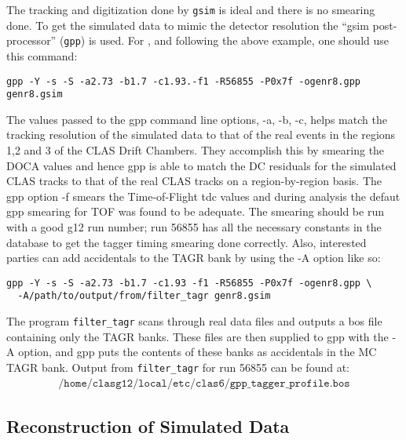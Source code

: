 The tracking and digitization done by \texttt{gsim} is ideal and there is no smearing done. To get the simulated data to mimic the detector resolution the ``gsim post-processor'' (\texttt{gpp}) is used. For , and following the above example, one should use this command:
\begin{verbatim}
gpp -Y -s -S -a2.73 -b1.7 -c1.93.-f1 -R56855 -P0x7f -ogenr8.gpp genr8.gsim
\end{verbatim}
The values passed to the gpp command line options, -a, -b, -c, helps match the tracking resolution of the simulated data to that of the real events in the regions 1,2 and 3 of the CLAS Drift Chambers. They accomplish this by smearing the DOCA values and hence gpp is able to match the DC residuals for the simulated CLAS tracks to that of the real CLAS tracks on a region-by-region basis. The gpp option -f smears the Time-of-Flight tdc values and during analysis the defaut gpp smearing for TOF was found to be adequate. The smearing should be run with a good g12 run number; run 56855 has all the necessary constants in the database to get the tagger timing smearing done correctly. Also, interested parties can add accidentals to the TAGR bank by using the -A option like so:
\begin{verbatim}
gpp -Y -s -S -a2.73 -b1.7 -c1.93 -f1 -R56855 -P0x7f -ogenr8.gpp \
  -A/path/to/output/from/filter_tagr genr8.gsim
\end{verbatim}
The program \texttt{filter\_tagr} scans through real data files and outputs a bos file containing only the TAGR banks. These files are then supplied to gpp with the -A option, and gpp puts the contents of these banks as accidentals in the MC TAGR bank. Output from \texttt{filter\_tagr} for run 56855 can be found at:
\begin{align}
    \texttt{/home/clasg12/local/etc/clas6/gpp\_tagger\_profile.bos} \nonumber
\end{align}

\FloatBarrier




\subsection{\label{sec:sim.recon}Reconstruction of Simulated Data}

\FloatBarrier






